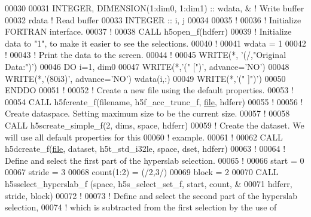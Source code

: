 \begin{DoxyCode}
00030 
00031   \textcolor{keywordtype}{INTEGER}, \textcolor{keywordtype}{DIMENSION(1:dim0, 1:dim1)} :: wdata, & \textcolor{comment}{! Write buffer }
00032                                         rdata    \textcolor{comment}{! Read buffer}
00033   \textcolor{keywordtype}{INTEGER} :: i, j
00034 
00035   \textcolor{comment}{!}
00036   \textcolor{comment}{! Initialize FORTRAN interface.}
00037   \textcolor{comment}{!}
00038   \textcolor{keyword}{CALL }h5open\_f(hdferr)
00039   \textcolor{comment}{! Initialize data to "1", to make it easier to see the selections.}
00040   \textcolor{comment}{!}
00041   wdata = 1
00042   \textcolor{comment}{!}
00043   \textcolor{comment}{! Print the data to the screen.}
00044   \textcolor{comment}{!}
00045   \textcolor{keyword}{WRITE}(*, \textcolor{stringliteral}{'(/,"Original Data:")'})
00046   \textcolor{keywordflow}{DO} i=1, dim0
00047      \textcolor{keyword}{WRITE}(*,\textcolor{stringliteral}{'(" [")'}, advance=\textcolor{stringliteral}{'NO'})
00048      \textcolor{keyword}{WRITE}(*,\textcolor{stringliteral}{'(80i3)'}, advance=\textcolor{stringliteral}{'NO'}) wdata(i,:)
00049      \textcolor{keyword}{WRITE}(*,\textcolor{stringliteral}{'(" ]")'})
00050 \textcolor{keywordflow}{  ENDDO}
00051   \textcolor{comment}{!}
00052   \textcolor{comment}{! Create a new file using the default properties.}
00053   \textcolor{comment}{!}
00054   \textcolor{keyword}{CALL }h5fcreate\_f(filename, h5f\_acc\_trunc\_f, \hyperlink{structfile}{file}, hdferr)
00055   \textcolor{comment}{!}
00056   \textcolor{comment}{! Create dataspace.  Setting maximum size to be the current size.}
00057   \textcolor{comment}{!}
00058   \textcolor{keyword}{CALL }h5screate\_simple\_f(2, dims, space, hdferr)
00059   \textcolor{comment}{! Create the dataset.  We will use all default properties for this}
00060   \textcolor{comment}{! example.}
00061   \textcolor{comment}{!}
00062   \textcolor{keyword}{CALL }h5dcreate\_f(\hyperlink{structfile}{file}, dataset, h5t\_std\_i32le, space, dset, hdferr)
00063   \textcolor{comment}{!}
00064   \textcolor{comment}{! Define and select the first part of the hyperslab selection.}
00065   \textcolor{comment}{!  }
00066   start = 0
00067   stride = 3
00068   count(1:2) = (/2,3/)
00069   block = 2
00070   \textcolor{keyword}{CALL }h5sselect\_hyperslab\_f (space, h5s\_select\_set\_f, start, count, &
00071        hdferr, stride, block)
00072   \textcolor{comment}{!}
00073   \textcolor{comment}{! Define and select the second part of the hyperslab selection,}
00074   \textcolor{comment}{! which is subtracted from the first selection by the use of}

\end{DoxyCode}
